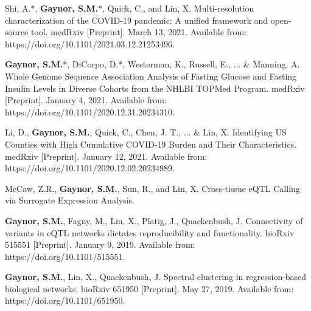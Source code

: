 \begin{cvpapers}
	
		\cvpaper
	{{Shi, A.}*, \textbf{Gaynor, S.M.}*, Quick, C., and Lin, X. Multi-resolution characterization of the COVID-19 pandemic: A unified framework and open-source tool. medRxiv [Preprint]. March 13, 2021. Available from: https://doi.org/10.1101/2021.03.12.21253496.} %
	{} %
	{ } %
	{} %
	
	\cvpaper
	{\textbf{Gaynor, S.M.}*, DiCorpo, D.*, Westerman, K., Russell, E., ... \& Manning, A. Whole Genome Sequence Association Analysis of Fasting Glucose and Fasting Insulin Levels in Diverse Cohorts from the NHLBI TOPMed Program. medRxiv [Preprint]. January 4, 2021. Available from: https://doi.org/10.1101/2020.12.31.20234310.} %
	{} %
	{ } %
	{} %
	
	\cvpaper
	{Li, D., \textbf{Gaynor, S.M.}, Quick, C., Chen, J. T., ... \& Lin, X. Identifying US Counties with High Cumulative COVID-19 Burden and Their Characteristics. medRxiv [Preprint]. January 12, 2021. Available from: https://doi.org/10.1101/2020.12.02.20234989.} %
		{} %
	{ } %
	{} %
	
	\cvpaper
	{McCaw, Z.R., \textbf{Gaynor, S.M.}, Sun, R.,  and Lin, X. Cross-tissue eQTL Calling via Surrogate Expression Analysis.} %
	{} %
	{ } %
	{} %
	
	\cvpaper
	{\textbf{Gaynor, S.M.}, Fagny, M., Lin, X., Platig, J., Quackenbush, J. Connectivity of variants in eQTL networks dictates reproducibility and functionality. bioRxiv 515551 [Preprint]. January 9, 2019. Available from: https://doi.org/10.1101/515551.} %
	{} %
	{ } %
	{} %
	
	\cvpaper
	{\textbf{Gaynor, S.M.}, Lin, X., Quackenbush, J. Spectral clustering in regression-based biological networks. bioRxiv 651950 [Preprint]. May 27, 2019. Available from: https://doi.org/10.1101/651950.} %
	{} %
	{ } %
	{} %
	
	
	
\end{cvpapers}